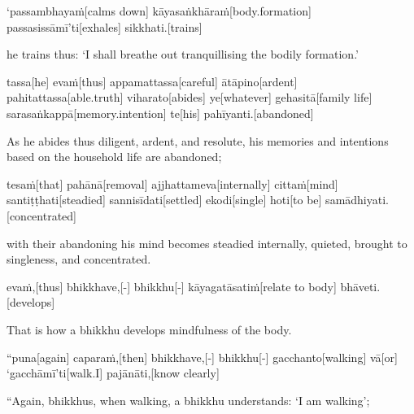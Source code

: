 \begin{samepage}
\begingl[glneveryline={\PaliGlossA,\PaliGlossB}]
‘passambhayaṁ[calms down] kāyasaṅkhāraṁ[body.formation] passasissāmī’ti[exhales] sikkhati.[trains]
\endgl
\nopagebreak
\linespread{0.5}
\begin{spacin}{0.2}
{\PaliGlossFT he trains thus: ‘I shall breathe out tranquillising the bodily formation.’}
\end{spacin}
\vskip 12pt
\end{samepage}
\begin{samepage}
\begingl[glneveryline={\PaliGlossA,\PaliGlossB}]
tassa[he] evaṁ[thus] appamattassa[careful] ātāpino[ardent] pahitattassa[able.truth] viharato[abides] ye[whatever] gehasitā[family life] sarasaṅkappā[memory.intention] te[his] pahīyanti.[abandoned]
\endgl
\nopagebreak
\linespread{0.5}
\begin{spacin}{0.2}
{\PaliGlossFT As he abides thus diligent, ardent, and resolute, his memories and intentions based on the household life are abandoned;}
\end{spacin}
\vskip 12pt
\end{samepage}
\begin{samepage}
\begingl[glneveryline={\PaliGlossA,\PaliGlossB}]
tesaṁ[that] pahānā[removal] ajjhattameva[internally] cittaṁ[mind] santiṭṭhati[steadied] sannisīdati[settled] ekodi[single] hoti[to be] samādhiyati.[concentrated]
\endgl
\nopagebreak
\linespread{0.5}
\begin{spacin}{0.2}
{\PaliGlossFT with their abandoning his mind becomes steadied internally, quieted, brought to singleness, and concentrated.}
\end{spacin}
\vskip 12pt
\end{samepage}
\begin{samepage}
\begingl[glneveryline={\PaliGlossA,\PaliGlossB}]
evaṁ,[thus] bhikkhave,[-] bhikkhu[-] kāyagatāsatiṁ[relate to body] bhāveti.[develops]
\endgl
\nopagebreak
\linespread{0.5}
\begin{spacin}{0.2}
{\PaliGlossFT That is how a bhikkhu develops mindfulness of the body.}
\end{spacin}
\vskip 12pt
\end{samepage}
\vskip 0.2in
\begin{samepage}
\begingl[glneveryline={\PaliGlossA,\PaliGlossB}]
“puna[again] caparaṁ,[then] bhikkhave,[-] bhikkhu[-] gacchanto[walking] vā[or] ‘gacchāmī’ti[walk.I] pajānāti,[know clearly]
\endgl
\nopagebreak
\linespread{0.5}
\begin{spacin}{0.2}
{\PaliGlossFT “Again, bhikkhus, when walking, a bhikkhu understands: ‘I am walking’;}
\end{spacin}
\vskip 12pt
\end{samepage}
